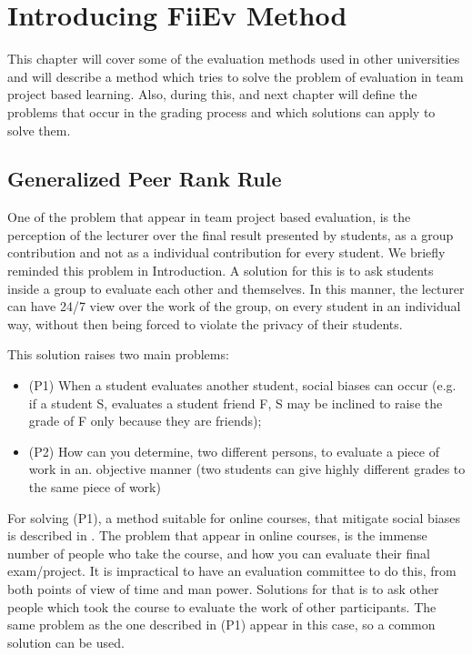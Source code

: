 \chapter{Introducing FiiEv Method}
\label{chapt1}
This chapter will cover some of the evaluation methods used in other universities and will describe a method which tries to solve the problem of evaluation in team project based learning. Also, during this, and next chapter will define the problems that occur in the grading process and which solutions can apply to solve them.

\section{Generalized Peer Rank Rule}
One of the problem that appear in team project based evaluation, is the perception of the lecturer over the final result presented by students, as a group contribution and not as a individual contribution for every student. We briefly reminded this problem in Introduction. A solution for this is to ask students inside a group to evaluate each other and themselves. In this manner, the lecturer can have 24/7 view over the work of the group, on every student in an individual way, without then being forced to violate the privacy of their students.

This solution raises two main problems:
\begin{itemize}
	\item (P1) When a student evaluates another student, social biases can occur (e.g. if a student S, evaluates a student friend F, S may be inclined to raise the grade of F only because they are friends);
	\item (P2) How can you determine, two different persons, to evaluate a piece of work in an. objective manner (two students can give highly different grades to the same piece of work) 
\end{itemize}
For solving (P1), a method suitable for online courses, that mitigate social biases is described in \cite{walsh}. The problem that appear in online courses, is the immense number of people who take the course, and how you can evaluate their final exam/project. It is impractical to have an evaluation committee to do this, from both points of view of time and man power. Solutions for that is to ask other people which took the course to evaluate the work of other participants. The same problem as the one described in (P1) appear in this case, so a common solution can be used.


